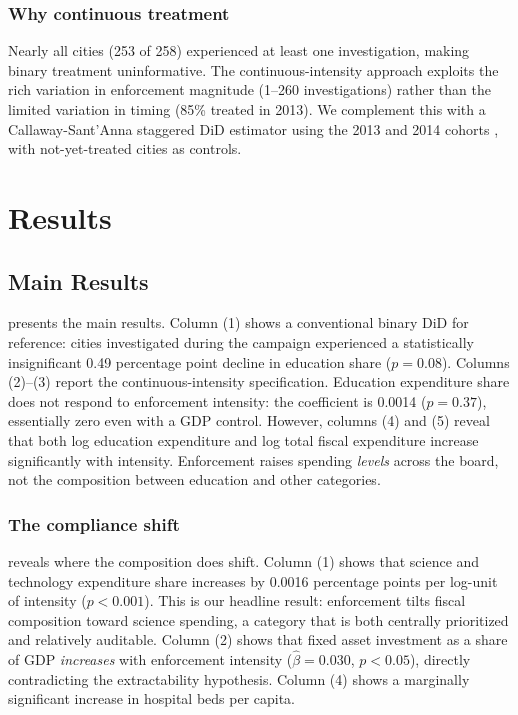 \documentclass[12pt]{article}
\begin{document}
\subsubsection*{Why continuous treatment} Nearly all cities (253 of 258) experienced at least one investigation, making binary treatment uninformative. The continuous-intensity approach exploits the rich variation in enforcement magnitude (1--260 investigations) rather than the limited variation in timing (85\% treated in 2013). We complement this with a Callaway-Sant'Anna staggered DiD estimator using the 2013 and 2014 cohorts \citep{callaway2021}, with not-yet-treated cities as controls.


\section{Results}

\subsection{Main Results}

 presents the main results. Column (1) shows a conventional binary DiD for reference: cities investigated during the campaign experienced a statistically insignificant 0.49 percentage point decline in education share ($p = 0.08$). Columns (2)--(3) report the continuous-intensity specification. Education expenditure share does not respond to enforcement intensity: the coefficient is 0.0014 ($p = 0.37$), essentially zero even with a GDP control. However, columns (4) and (5) reveal that both log education expenditure and log total fiscal expenditure increase significantly with intensity. Enforcement raises spending \emph{levels} across the board, not the composition between education and other categories.



\subsubsection*{The compliance shift}  reveals where the composition does shift. Column (1) shows that science and technology expenditure share increases by 0.0016 percentage points per log-unit of intensity ($p < 0.001$). This is our headline result: enforcement tilts fiscal composition toward science spending, a category that is both centrally prioritized and relatively auditable. Column (2) shows that fixed asset investment as a share of GDP \emph{increases} with enforcement intensity ($\hat{\beta} = 0.030$, $p < 0.05$), directly contradicting the extractability hypothesis. Column (4) shows a marginally significant increase in hospital beds per capita.
\end{document}
